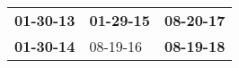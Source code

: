 \begin{supertabular}{p{0.33\columnwidth}p{0.33\columnwidth}p{0.33\columnwidth}}
 \textbf{01-30-13\textsuperscript{}} &  \textbf{01-29-15\textsuperscript{}} &  \textbf{08-20-17\textsuperscript{}} \\
 \textbf{01-30-14\textsuperscript{}} &           08-19-16\textsuperscript{} &  \textbf{08-19-18\textsuperscript{}} \\
\end{supertabular}
